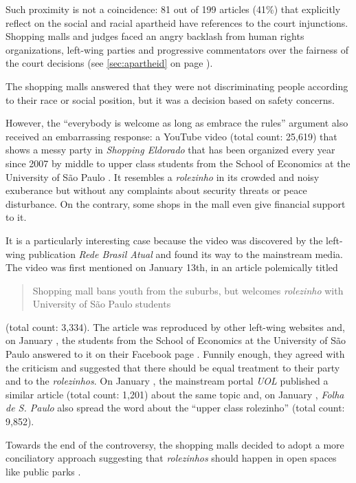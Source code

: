 Such proximity is not a coincidence: 81 out of 199 articles (41\%) that explicitly reflect on the social and racial apartheid have references to the court injunctions. Shopping malls and judges faced an angry backlash from human rights organizations, left-wing parties and progressive commentators over the fairness of the court decisions (see \autoref{sec:apartheid}  on page \pageref{sec:apartheid}). 

The shopping malls answered that they were not discriminating people according to their race or social position, but it was a decision based on safety concerns.

However, the \enquote{everybody is welcome as long as embrace the rules} argument also received an embarrassing response: a YouTube video (total count: 25,619) that shows a messy party in \emph{Shopping Eldorado} that has been organized every year since 2007 by middle to upper class students from the School of Economics at the University of São Paulo \autocite{youtube_fea_usp}. It resembles a \emph{rolezinho} in its crowded and noisy exuberance but without any complaints about security threats or peace disturbance. On the contrary, some shops in the mall even give financial support to it.

It is a particularly interesting case because the video was discovered by the left-wing publication \emph{Rede Brasil Atual} and found its way to the mainstream media. The video was first mentioned on January 13th, in an article polemically titled \blockcquote{rba_fea}{Shopping mall bans youth from the suburbs, but welcomes \emph{rolezinho} with University of São Paulo students} (total count: 3,334). The article was reproduced by other left-wing websites \autocite{altamiro_fea,brasil247_fea} and, on January , the students from the School of Economics at the University of São Paulo answered to it on their Facebook page \autocite{facebook_fea}. Funnily enough, they agreed with the criticism and suggested that there should be equal treatment to their party and to the \emph{rolezinhos}. On January , the mainstream portal \emph{UOL} published a similar article \autocite{uol_fea} (total count: 1,201) about the same topic and, on January , \emph{Folha de S. Paulo} also spread the word \autocite{folha_rolezinho_USP} about the \enquote{upper class rolezinho} (total count: 9,852).

Towards the end of the controversy, the shopping malls decided to adopt a more conciliatory approach \autocite{folha_reuniao_shoppings} suggesting that \emph{rolezinhos} should happen in open spaces like public parks \autocite{folha_alshop_organizacao}.

